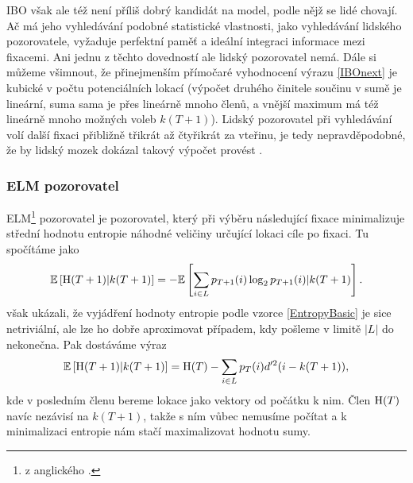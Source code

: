 IBO však ale též není příliš dobrý kandidát na model, podle nějž se
lidé chovají.  Ač má jeho vyhledávání podobné statistické vlastnosti, jako
vyhledávání lidského pozorovatele, vyžaduje perfektní paměť a ideální integraci
informace mezi fixacemi. Ani jednu z těchto dovedností ale lidský pozorovatel
nemá. Dále si můžeme všimnout, že přinejmenším přímočaré
vyhodnocení výrazu \eqref{IBOnext} je kubické v počtu potenciálních
lokací (výpočet druhého činitele součinu v sumě je lineární, suma sama je přes
lineárně mnoho členů, a vnější maximum má též lineárně mnoho možných voleb
$k(T+1)$). Lidský pozorovatel při vyhledávání volí další fixaci přibližně
třikrát až čtyřikrát za vteřinu, je tedy nepravděpodobné, že by lidský mozek
dokázal takový výpočet provést \citep{Najemnik08}. 

\subsubsection{ELM pozorovatel}

ELM\footnote{z anglického .} pozorovatel je
pozorovatel, který při výběru následující fixace minimalizuje střední hodnotu
entropie náhodné veličiny určující lokaci cíle po fixaci. Tu spočítáme jako
\begin{equation}\label{EntropyBasic}\mathbb{E}\left[\operatorname{H}(T+1)|k(T+1)\right]=-\mathbb{E}\left[\displaystyle\sum_{i\in
L}p_{T+1}(i)\log_2p_{T+1}(i)|k(T+1)\right].\end{equation} \citet{Najemnik09} však ukázali,
že vyjádření hodnoty entropie podle vzorce \eqref{EntropyBasic} je sice
netriviální, ale lze ho dobře aproximovat případem, kdy pošleme v limitě $|L|$
do nekonečna. Pak dostáváme výraz $$ \mathbb{E}\left[\operatorname{H}(T+1)|k(T+1)\right]= \operatorname{H}(T) -
\displaystyle\sum_{i\in L} p_T(i)d'^2(i-k(T+1)),$$ kde v posledním členu bereme
lokace jako vektory od počátku k nim. Člen $\operatorname{H}(T)$ navíc nezávisí na $k(T+1)$,
takže s ním vůbec nemusíme počítat a k minimalizaci entropie nám stačí
maximalizovat hodnotu sumy.

